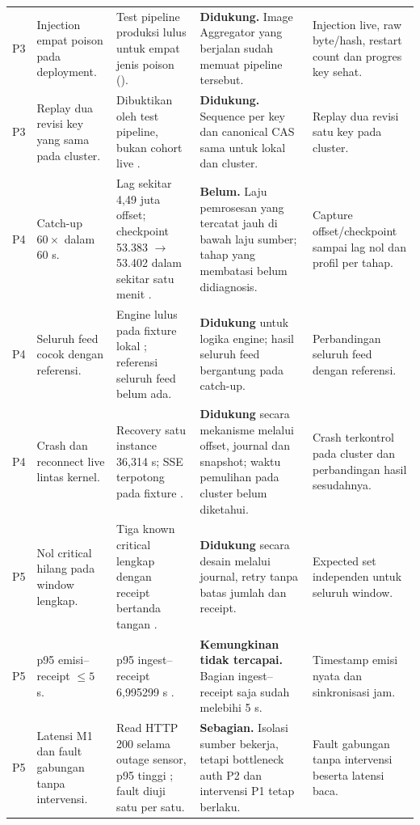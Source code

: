 {\begin{longtable}{@{}P{1.1cm}P{2.5cm}P{3.4cm}P{4.3cm}P{3.4cm}@{}}
P3 & Injection empat poison pada deployment. & Test pipeline produksi lulus untuk empat jenis poison (). & \textbf{Didukung.} Image Aggregator  yang berjalan sudah memuat pipeline tersebut. & Injection live, raw byte/hash, restart count dan progres key sehat.\\
P3 & Replay dua revisi key yang sama pada cluster. & Dibuktikan oleh test pipeline, bukan cohort live . & \textbf{Didukung.} Sequence per key dan canonical CAS sama untuk lokal dan cluster. & Replay dua revisi satu key pada cluster.\\
P4 & Catch-up $60\times$ dalam 60 s. & Lag sekitar 4,49 juta offset; checkpoint 53.383 $\rightarrow$ 53.402 dalam sekitar satu menit . & \textbf{Belum.} Laju pemrosesan yang tercatat jauh di bawah laju sumber; tahap yang membatasi belum didiagnosis. & Capture offset/checkpoint sampai lag nol dan profil per tahap.\\
P4 & Seluruh feed cocok dengan referensi. & Engine lulus pada fixture lokal ; referensi seluruh feed belum ada. & \textbf{Didukung} untuk logika engine; hasil seluruh feed bergantung pada catch-up. & Perbandingan seluruh feed dengan referensi.\\
P4 & Crash dan reconnect live lintas kernel. & Recovery satu instance 36,314 s; SSE terpotong pada fixture . & \textbf{Didukung} secara mekanisme melalui offset, journal dan snapshot; waktu pemulihan pada cluster belum diketahui. & Crash terkontrol pada cluster dan perbandingan hasil sesudahnya.\\
P5 & Nol critical hilang pada window lengkap. & Tiga known critical lengkap dengan receipt bertanda tangan . & \textbf{Didukung} secara desain melalui journal, retry tanpa batas jumlah dan receipt. & Expected set independen untuk seluruh window.\\
P5 & p95 emisi--receipt $\leq5$ s. & p95 ingest--receipt 6,995299 s . & \textbf{Kemungkinan tidak tercapai.} Bagian ingest--receipt saja sudah melebihi 5 s. & Timestamp emisi nyata dan sinkronisasi jam.\\
P5 & Latensi M1 dan fault gabungan tanpa intervensi. & Read HTTP 200 selama outage sensor, p95 tinggi ; fault diuji satu per satu. & \textbf{Sebagian.} Isolasi sumber bekerja, tetapi bottleneck auth P2 dan intervensi P1 tetap berlaku. & Fault gabungan tanpa intervensi beserta latensi baca.\\\bottomrule
\end{longtable}}

